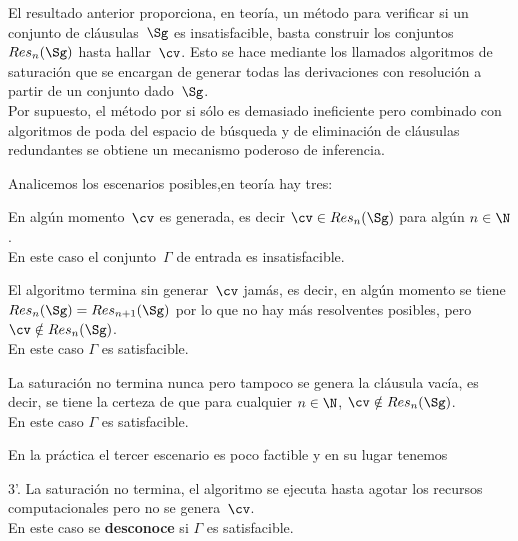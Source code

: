 \documentclass[11pt,letterpaper]{article}
\begin{document}
El resultado anterior proporciona, en teoría, un método para verificar
si un conjunto de cláusulas~$\Sg$ es insatisfacible, basta construir
los conjuntos~$Res_n(\Sg)$ hasta hallar~$\cv$. Esto se hace mediante
los llamados algoritmos de saturación que se encargan de generar todas las
derivaciones con resolución a partir de un conjunto dado~$\Sg$.\\ 
Por supuesto, el método por si s\'olo es demasiado ineficiente pero combinado
con algoritmos de poda del espacio de búsqueda y de eliminación de 
cláusulas redundantes se obtiene un mecanismo poderoso de inferencia.

\noindent Analicemos los escenarios posibles,en teoría hay tres:
\be
\item En algún momento~$\cv$ es generada, es decir $\cv\in Res_n(\Sg)$
  para algún $n\in\N$.\\ En este caso el conjunto~$\Gamma$ de entrada es 
  insatisfacible.
 \item El algoritmo termina sin generar~$\cv$ jamás, es decir, en algún 
  momento se tiene $Res_n(\Sg)=Res_{n+1}(\Sg)$ por lo que no hay más 
  resolventes posibles, pero $\cv\notin Res_n(\Sg)$.\\
  En este caso $\Gamma$ es satisfacible. 
\item La saturación no termina nunca pero tampoco se genera la cláusula
  vacía, es decir, se tiene la certeza de que para cualquier $n\in\N$,
  $\cv\notin Res_n(\Sg)$. \\En este caso $\Gamma$ es satisfacible.
\ee

\noindent En la práctica el tercer escenario es poco factible y en su lugar
tenemos
\be
\item[3'.] La saturación no termina, el algoritmo se ejecuta {hasta
    agotar los recursos computacionales} pero no se genera~$\cv$.\\
    En este caso se \textbf{desconoce} si $\Gamma$ es satisfacible.
\ee
\end{document}
